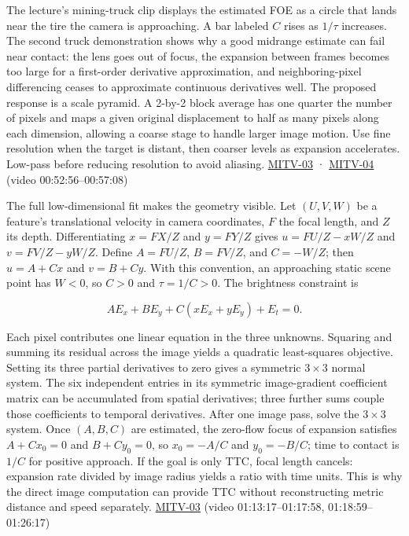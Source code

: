 The lecture's mining-truck clip displays the estimated FOE as a circle that lands near the tire the camera is approaching. A bar labeled \(C\) rises as \(1/\tau\) increases. The second truck demonstration shows why a good midrange estimate can fail near contact: the lens goes out of focus, the expansion between frames becomes too large for a first-order derivative approximation, and neighboring-pixel differencing ceases to approximate continuous derivatives well. The proposed response is a scale pyramid. A 2-by-2 block average has one quarter the number of pixels and maps a given original displacement to half as many pixels along each dimension, allowing a coarse stage to handle larger image motion. Use fine resolution when the target is distant, then coarser levels as expansion accelerates. Low-pass before reducing resolution to avoid aliasing. \hyperref[04-visual-computing-ii-ch036-mitv-03---time-to-contact-focus-of-expansion-direct-motion-vision-methods-noise-gain]{MITV-03} · \hyperref[04-visual-computing-ii-ch036-mitv-04---fixed-optical-flow-optical-mouse-constant-brightness-assumption-closed-form-solution]{MITV-04} (video 00:52:56--00:57:08)

The full low-dimensional fit makes the geometry visible. Let \((U,V,W)\) be a feature's translational velocity in camera coordinates, \(F\) the focal length, and \(Z\) its depth. Differentiating \(x=FX/Z\) and \(y=FY/Z\) gives \(u=FU/Z-xW/Z\) and \(v=FV/Z-yW/Z\). Define \(A=FU/Z\), \(B=FV/Z\), and \(C=-W/Z\); then \(u=A+Cx\) and \(v=B+Cy\). With this convention, an approaching static scene point has \(W<0\), so \(C>0\) and \(\tau=1/C>0\). The brightness constraint is

\[
AE_x+BE_y+C(xE_x+yE_y)+E_t=0.
\]

Each pixel contributes one linear equation in the three unknowns. Squaring and summing its residual across the image yields a quadratic least-squares objective. Setting its three partial derivatives to zero gives a symmetric \(3\times3\) normal system. The six independent entries in its symmetric image-gradient coefficient matrix can be accumulated from spatial derivatives; three further sums couple those coefficients to temporal derivatives. After one image pass, solve the \(3\times3\) system. Once \((A,B,C)\) are estimated, the zero-flow focus of expansion satisfies \(A+Cx_0=0\) and \(B+Cy_0=0\), so \(x_0=-A/C\) and \(y_0=-B/C\); time to contact is \(1/C\) for positive approach. If the goal is only TTC, focal length cancels: expansion rate divided by image radius yields a ratio with time units. This is why the direct image computation can provide TTC without reconstructing metric distance and speed separately. \hyperref[04-visual-computing-ii-ch036-mitv-03---time-to-contact-focus-of-expansion-direct-motion-vision-methods-noise-gain]{MITV-03} (video 01:13:17--01:17:58, 01:18:59--01:26:17)

